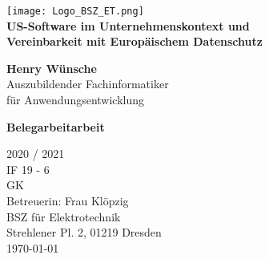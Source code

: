 \begin{titlepage}
    \begin{center}
        \texttt{[image: Logo\_BSZ\_ET.png]}\\
        \vspace*{1cm}
        {\huge\textbf{US-Software im Unternehmenskontext und\\Vereinbarkeit mit Europäischem Datenschutz}}

        \vspace{2cm}

            {\huge\textbf{Henry Wünsche}} \\
            Auszubildender Fachinformatiker \\ für Anwendungsentwicklung

        \vfill
        {\huge\textbf{Belegarbeitarbeit}}

        \vspace{1cm}
        {\Huge 2020 / 2021}\\
        \vspace{0.8cm}
        IF 19 - 6\\
        GK\\
        Betreuerin: Frau Klöpzig\\
        BSZ für Elektrotechnik\\
        Strehlener Pl. 2, 01219 Dresden\\
        \today

    \end{center}
\end{titlepage}
\pagebreak
